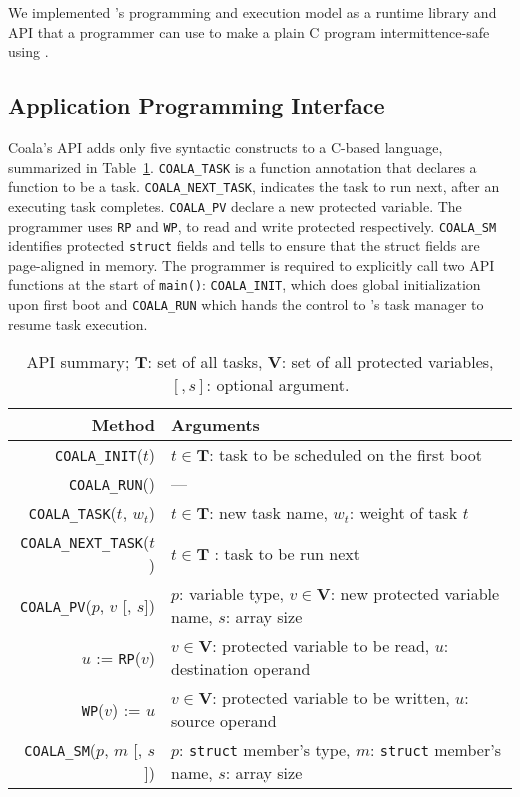 We implemented \sys's programming and execution model as a runtime library and API that a programmer can use to make a plain C program intermittence-safe using \sys.

\subsection{Application Programming Interface}
\label{sec:coala_api}

Coala's API adds only five syntactic constructs to a C-based language, summarized
in Table~\ref{table:coala_api}.
\texttt{COALA\_TASK} is a function annotation that declares a function to be a
task. \texttt{COALA\_NEXT\_TASK}, indicates the task to run next, after an
executing task completes.  \texttt{COALA\_PV} declare a new protected variable.
The programmer uses \texttt{RP} and \texttt{WP}, to read and write protected
respectively.  \texttt{COALA\_SM} identifies protected \texttt{struct} fields
and tells \sys to ensure that the struct fields are page-aligned in memory.
The programmer is required to explicitly call two API functions at the start of
{\tt main()}: \texttt{COALA\_INIT}, which does global initialization upon first
boot and \texttt{COALA\_RUN} which hands the control to \sys's task manager to
resume task execution.

\begin{table}
\centering
\begin{tabular}{| r | p{} |}
	\hline
	{Method} & {Arguments} \\
	\hline\hline
	\texttt{COALA\_INIT}($t$) & $t \in \mathbf{T}$: task to be scheduled on the first boot \\
	\hline
	\texttt{COALA\_RUN}() & --- \\
	\hline
	\texttt{COALA\_TASK}($t$, $w_t$) & $t \in \mathbf{T}$: new task name, $w_t$: weight of task $t$ \\
	\hline
	\texttt{COALA\_NEXT\_TASK}($t$) & $t \in \mathbf{T}$ : task to be run next \\
	\hline
	\texttt{COALA\_PV}($p$, $v$ [, $s$]) & $p$: variable type, $v \in \mathbf{V}$: new protected variable name, $s$: array size \\
	\hline
	$u$ := \texttt{RP}($v$) & $v \in \mathbf{V}$: protected variable to be read, $u$: destination operand \\
	\hline	
	\texttt{WP}($v$) := $u$ &  $v \in \mathbf{V}$: protected variable to be written, $u$: source operand \\
	\hline
	\texttt{COALA\_SM}($p$, $m$ [, $s$]) & $p$: \texttt{struct} member's type, $m$: \texttt{struct} member's name, $s$: array size \\
	\hline
\end{tabular}
\caption{API summary; $\mathbf{T}$: set of all tasks, $\mathbf{V}$: set of all protected variables, $[, s]$: optional argument.}
\label{table:coala_api}
\end{table}


